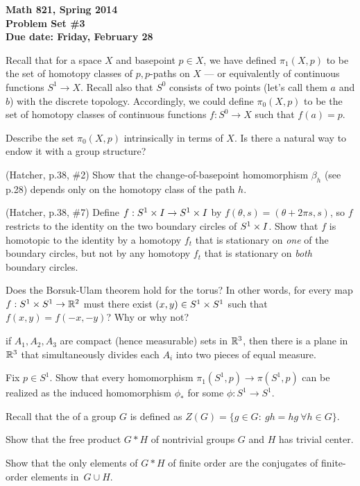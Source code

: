 
\usepackage{youngtab}

\thispagestyle{empty}
{\bf Math 821, Spring 2014\\
Problem Set \#3\\
Due date: Friday, February 28}

\prob Recall that for a space $X$ and basepoint $p\in X$, we have defined $\pi_1(X,p)$ to be
the set of homotopy classes of $p,p$-paths on $X$ --- or equivalently of continuous functions
$S^1\to X$.  Recall also that $S^0$ consists of two points (let's call them $a$ and $b$) with the discrete topology.
Accordingly, we could define $\pi_0(X,p)$ to be the set of homotopy classes of continuous functions $f:S^0\to X$
such that $f(a)=p$.

Describe the set $\pi_0(X,p)$ intrinsically in terms of $X$.  Is there a natural way to endow it with a group structure?

\prob (Hatcher, p.38, \#2) Show that the change-of-basepoint homomorphism $\beta_h$ (see p.28)
depends only on the homotopy class of the path $h$.

\prob (Hatcher, p.38, \#7) Define $f:S^1\times I\to S^1\times I$ by $f(\theta,s)=(\theta+2\pi s,s)$,
so $f$ restricts to the identity on the two boundary circles of $S^1\times I$.   Show that $f$ is homotopic
to the identity by a homotopy $f_t$ that is stationary on \emph{one} of the boundary circles, but not
by any homotopy $f_t$ that is stationary on \emph{both} boundary circles.

\prob [Hatcher p.38 \#8] Does the Borsuk-Ulam theorem hold for the torus?  In other words, for every map $f:S^1\times S^1\to\mathbb{R}^2$ must there exist $(x,y)\in S^1\times S^1$ such that $f(x,y)=f(-x,-y)$?  Why or why not?

 if $A_1,A_2,A_3$ are compact (hence measurable) sets in $\mathbb{R}^3$, then there is a plane in $\mathbb{R}^3$ that simultaneously divides each $A_i$ into two pieces of equal measure.

\prob [Hatcher p.39 \#12] Fix $p\in S^1$.  Show that every homomorphism $\pi_1(S^1,p)\to\pi(S^1,p)$ can be realized as the induced homomorphism $\phi_*$ for some $\phi:S^1\to S^1$.

\prob [Hatcher, p.52, \#1]  Recall that the  of a group $G$ is defined as $Z(G)=\{g\in G:\ gh=hg \ \forall h\in G\}$.

\probpart Show that the free product $G*H$ of nontrivial groups $G$ and $H$ has trivial center.

\probpart Show that the only elements of $G*H$ of finite order are the conjugates of finite-order elements in~$G\cup H$.




